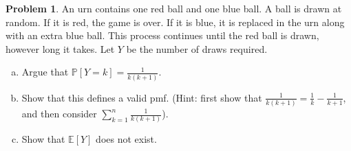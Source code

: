 \documentclass[10pt]{article}
\theoremstyle{definition}
\newtheorem{problem}[theorem]{Problem}
\newcommand{\1}[1]{\textbf{1}_{\left[#1\right]}} %
\def\E{\mathbb{E}} %
\def\P{\mathbb{P}} %
\begin{document}
\begin{problem}%
  An urn contains one red ball and one blue ball. A ball is drawn at random.
  If it is red, the game is over. If it is blue, it is replaced in the urn
  along with an extra blue ball. This process continues until the red ball is
  drawn, however long it takes. Let $Y$ be the number of draws required.
  \begin{enumerate}[(a)]
    \item Argue that $\P\left[Y=k \right] = \frac{1}{k(k+1)}$.
    \item Show that this defines a valid pmf. (Hint: first show that
    $\frac{1}{k(k+1)}= \frac{1}{k}-\frac{1}{k+1}$, and then consider
    $\sum_{k=1}^{n}\frac{1}{k(k+1)}$).
    \item Show that $\E\left[Y \right]$ does not exist.
  \end{enumerate}
\end{problem}


\end{document}
